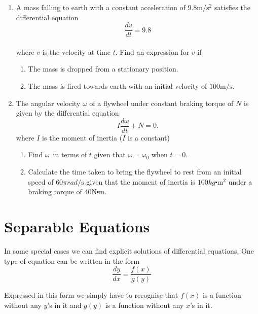 \begin{enumerate}
\item A mass falling to earth with a constant acceleration of $9.8 \mathrm{m}/\mathrm{s}^{2}$ satisfies the differential equation
\begin{equation*}\frac{d v}{d t} =9.8
\end{equation*} \\\relax where $v$ is the velocity at time $t$.  Find an expression for $v$ if 


\begin{enumerate}
\item The mass is dropped from a stationary position. 

\item The
mass is fired towards earth with an initial velocity of $100 \mathrm{m}/\mbox{s}\text{.}$ \end{enumerate}


\item The angular velocity
$\omega $ of a flywheel under constant braking torque of $N$ is given by the differential equation
\begin{equation*}I \frac{d \omega }{d t} +N =0.
\end{equation*}where $I$ is the moment of inertia ($I$ is a constant) 


\begin{enumerate}
\item Find $\omega $\ in terms of $t$ given that $\omega  =\omega _{0}$ when $t =0$. 

\item Calculate the time taken to bring the flywheel to rest from an initial
speed of $60 \pi  rad/\mbox{s}$ given that the moment of inertia is $100 kg \centerdot \mathrm{m}^{2}$ under a braking torque of $40 \mathrm{N} \centerdot \mbox{m}\text{.}$ \end{enumerate}
\end{enumerate}


\section{Separable Equations}
In some special cases we can find explicit solutions of differential equations. One type of equation can be written in the form
\begin{equation*}\frac{d y}{d x} =\frac{f (x)}{g (y)}
\end{equation*}

Expressed in this form we simply have to recognise that $f (x)$ is a function without any $y$'s in it and $g (y)$ is a function without any $x$'s in it. 


